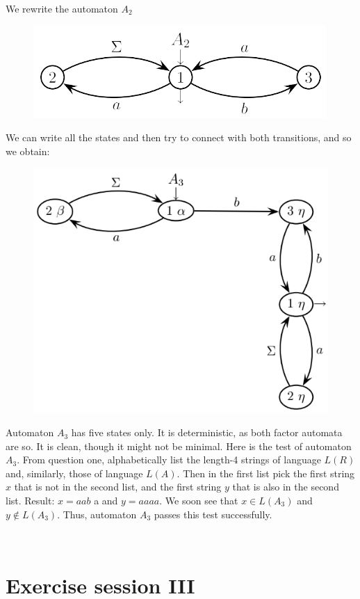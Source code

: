 \documentclass[12pt, a4paper]{report}
\newtheorem[style=M, bodystyle=\normalfont]{theorem}{Theorem}
\newtheorem[style=M, bodystyle=\normalfont]{corollary}{Corollary}
\newtheorem[style=M, bodystyle=\normalfont]{lemma}{Lemma}
\newtheorem[style=M, bodystyle=\normalfont]{definition}{Definition}
\begin{document}
\begin{enumerate}
\begin{figure}[H]
                \end{figure}
                We rewrite the automaton $A_2$
                \begin{figure}[H]
                    \centering
                    \includegraphics[width=0.5\linewidth]{images/FSA6a.png}
                \end{figure}
                We can write all the states and then try to connect with both transitions, and so we obtain: 
                \begin{figure}[H]
                    \centering
                    \includegraphics[width=0.5\linewidth]{images/FSA7a.png}
                \end{figure}
                Automaton $A_3$ has five states only. It is deterministic, as both factor automata are so. It is clean, though it might not be minimal. Here is the test of automaton $A_3$. From question one, 
                alphabetically list the length-4 strings of language $L(R)$ and, similarly, those of language $L(A)$. Then in the first list pick the first string $x$ that is not in the second list, and the first 
                string $y$ that is also in the second list. Result: $x=a a b$ a and $y=a a a a$. We soon see that $x \in L(A_3)$ and $y \notin L(A_3)$. Thus, automaton $A_3$ passes this test successfully.
        \end{enumerate}

\newpage

\

\newpage

\chapter{Exercise session III}
\end{document}
